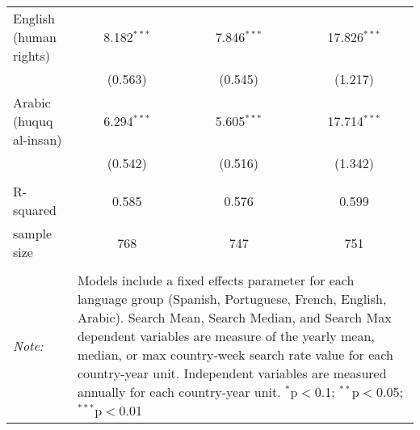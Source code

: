 \begin{table}[!htbp]
\begin{tabular}{@{\extracolsep{5pt}}lccc}
  English (human rights) & 8.182$^{***}$ & 7.846$^{***}$ & 17.826$^{***}$ \\ 
  & (0.563) & (0.545) & (1.217) \\ 
  Arabic (huquq al-insan) & 6.294$^{***}$ & 5.605$^{***}$ & 17.714$^{***}$ \\ 
  & (0.542) & (0.516) & (1.342) \\ 
 \hline \\[-1.8ex] 
R-squared  & 0.585 & 0.576 & 0.599 \\ 
sample size  & 768 & 747 & 751 \\ 
\hline 
\hline \\[-1.8ex] 
\textit{Note:}  & \multicolumn{3}{l}{\parbox[t]{8cm}{Models include a fixed effects parameter for each language group (Spanish, Portuguese, French, English, Arabic). Search Mean, Search Median, and Search Max dependent variables are measure of the yearly mean, median, or max country-week search rate value for each country-year unit. Independent variables are measured annually for each country-year unit. $^{*}$p$<$0.1; $^{**}$p$<$0.05; $^{***}$p$<$0.01}} \\ 
\end{tabular} 
\end{table} 
